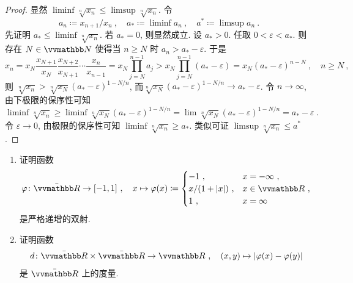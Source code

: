 \begin{proof}
    显然 \(\liminf \sqrt[n]{x_n} \leq \limsup \sqrt[n]{x_n}\). 令
    \[
        a_n \coloneqq x_{n + 1} / x_n\ ,\quad a_\ast \coloneqq \liminf a_n\ ,\quad a^\ast \coloneqq \limsup a_n\ .
    \]
    先证明 \(a_\ast \leq \liminf \sqrt[n]{x_n}\). 若 \(a_\ast = 0\), 则显然成立. 设 \(a_\ast > 0\). 任取 \(0 < \varepsilon < a_\ast\). 则存在 \(N \in \N\) 使得当 \(n \geq N\) 时 \(a_n > a_\ast - \varepsilon\). 于是
    \[
        x_n = x_N \frac{x_{N + 1}}{x_N} \frac{x_{N + 2}}{x_{N + 1}} \cdots \frac{x_n}{x_{n - 1}} = x_N \prod_{j = N}^{n - 1} a_j > x_N \prod_{j = N}^{n - 1} (a_\ast - \varepsilon) = x_N (a_\ast - \varepsilon)^{n - N}\ ,\quad n \geq N\ ,
    \]
    则 \(\sqrt[n]{x_n} > \sqrt[n]{x_N} (a_\ast - \varepsilon)^{1 - N / n}\), 而\(\sqrt[n]{x_N} (a_\ast - \varepsilon)^{1 - N / n} \to a_\ast - \varepsilon\). 令 \(n \to \infty\), 由下极限的保序性可知
    \[
        \liminf \sqrt[n]{x_n} \geq \liminf \sqrt[n]{x_N} (a_\ast - \varepsilon)^{1 - N / n} = \lim \sqrt[n]{x_N} (a_\ast - \varepsilon)^{1 - N / n} = a_\ast - \varepsilon\ .
    \]
    令 \(\varepsilon \to 0\), 由极限的保序性可知 \(\liminf \sqrt[n]{x_n} \geq a_\ast\). 类似可证 \(\limsup \sqrt[n]{x_n} \leq a^\ast\).
\end{proof}

\begin{exercise}
    \begin{enumerate}
        \item 证明函数
        \[
            \varphi \colon \bar \R \to [- 1, 1]\ ,\quad x \mapsto \varphi(x) \coloneqq
            \begin{cases}
                - 1\ ,           & x = - \infty\ , \\
                x / (1 + |x|)\ , & x \in \R\ , \\
                1\ ,             & x = \infty
            \end{cases}
        \]
        是严格递增的双射.
        \item 证明函数
        \[
            d \colon \bar \R \times \bar \R \to \R\ ,\quad (x, y) \mapsto |\varphi(x) - \varphi(y)|
        \]
        是 \(\bar \R\) 上的度量.
    \end{enumerate}
\end{exercise}

